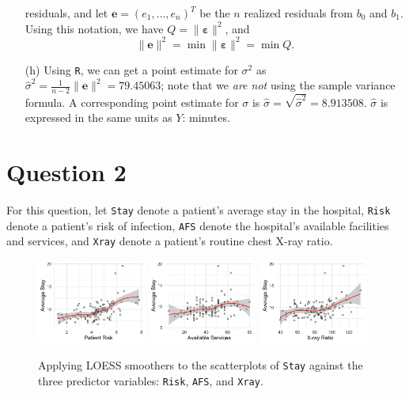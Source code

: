 \documentclass[10pt]{article}
\begin{document}
\begin{itemize}
    residuals, and let \(\mathbf{e} = (e_1, \ldots, e_n)^T\) be the \(n\) realized residuals from \(b_0\)
    and \(b_1\). Using this 
    notation, we have \(Q = \| \bm{\varepsilon} \|^2\), and \[\| \mathbf{e}\|^2 = \min \|\bm{\varepsilon}\|^2 = \min Q.\]
    \item[(h)] Using \texttt{R}, we can get a point estimate for \(\sigma^2\) as \(\hat{\sigma}^2 = \frac{1}{n-2} \|\mathbf{e}\|^2 = 79.45063\); note that we 
    \textit{are not} using the sample variance formula. A corresponding point estimate for \(\sigma\) is \(\hat{\sigma} = \sqrt{\hat{\sigma}^2} = 8.913508\). 
    \(\hat{\sigma}\) is expressed in the same units as \(Y\): minutes. 

\end{itemize}

\section{Question 2} \noindent
For this question, let \texttt{Stay} denote a patient's average stay in the hospital, \texttt{Risk} denote a patient's risk of infection, \texttt{AFS} 
denote the hospital's available facilities and services, and \texttt{Xray} denote a patient's routine chest X-ray ratio. 
\begin{figure}[ht]
    \includegraphics[width = 0.32\textwidth]{q02_loess1.png}
    \includegraphics[width = 0.32\textwidth]{q02_loess2.png}
    \includegraphics[width = 0.32\textwidth]{q02_loess3.png}
    \caption{Applying LOESS smoothers to the scatterplots of \texttt{Stay} against the three predictor variables: \texttt{Risk}, \texttt{AFS}, and 
    \texttt{Xray}.}
    \label{q02_fig01}
\end{figure}
\end{document}
